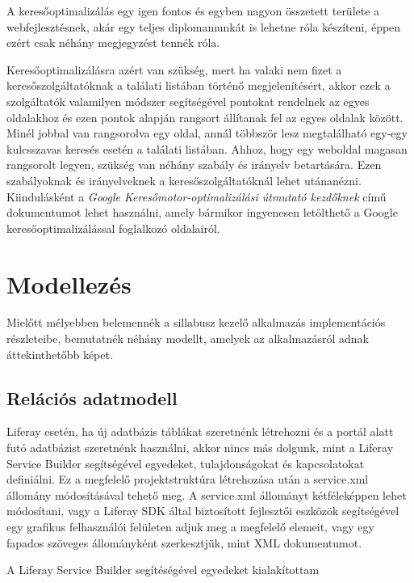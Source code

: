 \documentclass[hidelinks, 12pt, a4paper]{report}
\begin{document}
A keresőoptimalizálás egy igen fontos és egyben nagyon összetett területe a webfejlesztésnek, akár egy teljes diplomamunkát is lehetne róla készíteni, éppen ezért csak néhány megjegyzést tennék róla.

Keresőoptimalizálásra azért van szükség, mert ha valaki nem fizet a keresőszolgáltatóknak a találati listában történő megjelenítésért, akkor ezek a szolgáltatók valamilyen módszer segítségével pontokat rendelnek az egyes oldalakhoz és ezen pontok alapján rangsort állítanak fel az egyes oldalak között. Minél jobbal van rangsorolva egy oldal, annál többször lesz megtalálható egy-egy kulcsszavas keresés esetén a találati listában. Ahhoz, hogy egy weboldal magasan rangsorolt legyen, szükség van néhány szabály és irányelv betartására. Ezen szabályoknak és irányelveknek a keresőszolgáltatóknál lehet utánanézni. Kiindulásként a \emph{Google Keresőmotor-optimalizálási útmutató kezdőknek} című dokumentumot lehet használni, amely bármikor ingyenesen letölthető a Google keresőoptimalizálással foglalkozó oldalairól.


\chapter{Modellezés}

Mielőtt mélyebben belemennék a sillabusz kezelő alkalmazás implementációs részleteibe,  bemutatnék néhány modellt, amelyek az alkalmazásról adnak áttekinthetőbb képet.

\section{Relációs adatmodell}

Liferay esetén, ha új adatbázis táblákat szeretnénk létrehozni és a portál alatt futó adatbázist szeretnénk használni, akkor nincs más dolgunk, mint a Liferay Service Builder segítségével egyedeket, tulajdonságokat és kapcsolatokat definiálni. Ez a megfelelő projektstruktúra létrehozása után a service.xml állomány módosításával tehető meg. A service.xml állományt kétféleképpen lehet módosítani, vagy a Liferay SDK által biztosított fejlesztői eszközök segítségével egy grafikus felhasználói felületen adjuk meg a megfelelő elemeit, vagy egy fapados szöveges állományként szerkesztjük, mint XML dokumentumot.


A Liferay Service Builder segítéségével egyedeket kialakítottam
\end{document}
